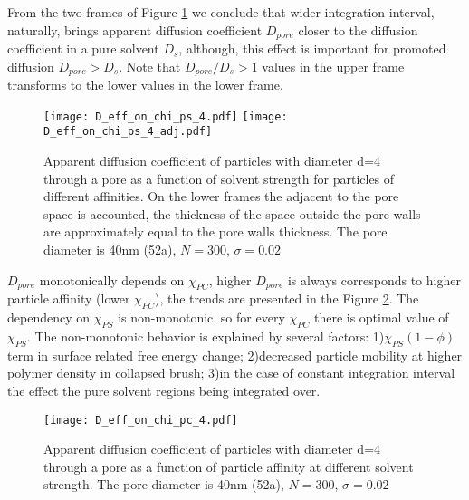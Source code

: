 \documentclass[12pt,a4paper]{article}
\begin{document}
From the two frames of Figure \ref{fig: D_eff_on_chi_ps} we conclude that wider integration interval, naturally, brings apparent diffusion coefficient  $D_{pore}$ closer to the diffusion coefficient in a pure solvent $D_s$, although, this effect is important for promoted diffusion $D_{pore} > D_s$.
Note that $D_{pore}/D_s > 1$ values in the upper frame transforms to the lower values in the lower frame.


\begin{figure}
    \texttt{[image: D\_eff\_on\_chi\_ps\_4.pdf]}
    \texttt{[image: D\_eff\_on\_chi\_ps\_4\_adj.pdf]}
    \caption[]{Apparent diffusion coefficient of particles with diameter d=4 through a pore as a function of solvent strength for particles of different affinities. 
    On the lower frames the adjacent to the pore space is accounted, the thickness of the space outside the pore walls are approximately equal to the pore walls thickness.
    The pore diameter is 40nm (52a), $N=300$, $\sigma=0.02$
    }
    \label{fig: D_eff_on_chi_ps}
\end{figure}

$D_{pore}$ monotonically depends on $\chi_{PC}$, higher $D_{pore}$ is always corresponds to higher particle affinity (lower $\chi_{PC}$), the trends are presented in the Figure \ref{fig: D_eff_on_chi_pc}.
The dependency on $\chi_{PS}$ is non-monotonic, so for every $\chi_{PC}$ there is optimal value of $\chi_{PS}$. 
The non-monotonic behavior is explained by several factors: 
1)$\chi_{PS}(1-\phi)$ term in surface related free energy change; 
2)decreased particle mobility at higher polymer density in collapsed brush; 
3)in the case of constant integration interval the effect the pure solvent regions being integrated over.

\begin{figure}
    \texttt{[image: D\_eff\_on\_chi\_pc\_4.pdf]}
    \caption[]{Apparent diffusion coefficient of particles with diameter d=4 through a pore as a function of particle affinity at different solvent strength. 
    The pore diameter is 40nm (52a), $N=300$, $\sigma=0.02$
    }
    \label{fig: D_eff_on_chi_pc}
\end{figure}
\end{document}

